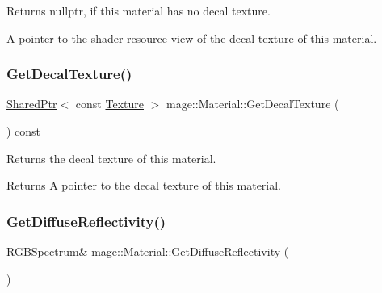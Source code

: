 \begin{DoxyReturn}{Returns}
{\ttfamily nullptr}, if this material has no decal texture. 

A pointer to the shader resource view of the decal texture of this material. 
\end{DoxyReturn}
\hypertarget{structmage_1_1_material_a059dccc9de58535541ab4286b0bb73e4}{}\label{structmage_1_1_material_a059dccc9de58535541ab4286b0bb73e4} 
\subsubsection{\texorpdfstring{Get\+Decal\+Texture()}{GetDecalTexture()}}
{\footnotesize\ttfamily \hyperlink{namespacemage_a1e01ae66713838a7a67d30e44c67703e}{Shared\+Ptr}$<$ const \hyperlink{classmage_1_1_texture}{Texture} $>$ mage\+::\+Material\+::\+Get\+Decal\+Texture (\begin{DoxyParamCaption}{ }\end{DoxyParamCaption}) const\hspace{0.3cm}{\ttfamily [noexcept]}}

Returns the decal texture of this material.

\begin{DoxyReturn}{Returns}
A pointer to the decal texture of this material. 
\end{DoxyReturn}
\hypertarget{structmage_1_1_material_afb37e1cd37df82b6607a4e5998e58ea8}{}\label{structmage_1_1_material_afb37e1cd37df82b6607a4e5998e58ea8} 
\subsubsection{\texorpdfstring{Get\+Diffuse\+Reflectivity()}{GetDiffuseReflectivity()}\hspace{0.1cm}{\footnotesize\ttfamily [1/2]}}
{\footnotesize\ttfamily \hyperlink{structmage_1_1_r_g_b_spectrum}{R\+G\+B\+Spectrum}\& mage\+::\+Material\+::\+Get\+Diffuse\+Reflectivity (\begin{DoxyParamCaption}{ }\end{DoxyParamCaption})\hspace{0.3cm}{\ttfamily [noexcept]}}

